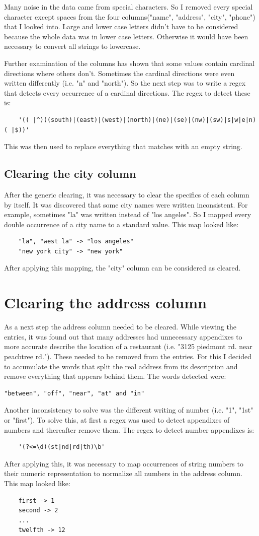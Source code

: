 \documentclass[conference]{IEEEtran}
\begin{document}
Many noise in the data came from special characters. So I removed every special character except spaces from the four columns("name", "address", "city", "phone") that I looked into. Large and lower case letters didn't have to be considered because the whole data was in lower case letters. Otherwise it would have been necessary to convert all strings to lowercase.

Further examination of the columns has shown that some values contain cardinal directions where others don't. Sometimes the cardinal directions were even written differently (i.e. "n" and "north"). So the next step was to write a regex that detects every occurrence of a cardinal directions. The regex to detect these is: 
\begin{lstlisting}
	'(( |^)((south)|(east)|(west)|(north)|(ne)|(se)|(nw)|(sw)|s|w|e|n)( |$))'
\end{lstlisting}
This was then used to replace everything that matches with an empty string.
\subsection{Clearing the city column}
After the generic clearing, it was necessary to clear the specifics of each column by itself. It was discovered that some city names were written inconsistent. For example, sometimes "la" was written instead of "los angeles". So I mapped every double occurrence of a city name to a standard value. This map looked like: 
\begin{lstlisting}
	"la", "west la" -> "los angeles"
	"new york city" -> "new york"
\end{lstlisting}
After applying this mapping, the "city" column can be considered as cleared.  
\section{Clearing the address column}
As a next step the address column needed to be cleared. While viewing the entries, it was found out that many addresses had unnecessary appendixes to more accurate describe the location of a restaurant (i.e. "3125 piedmont rd. near peachtree rd."). These needed to be removed from the entries. For this I decided to accumulate the words that split the real address from its description and remove everything that appears behind them. The words detected were: 
\begin{lstlisting}
"between", "off", "near", "at" and "in"
\end{lstlisting}
Another inconsistency to solve was the different writing of number (i.e. "1", "1st" or "first"). To solve this, at first a regex was used to detect appendixes of numbers and thereafter remove them. The regex to detect number appendixes is: 
\begin{lstlisting}
	'(?<=\d)(st|nd|rd|th)\b'
\end{lstlisting}
After applying this, it was necessary to map occurrences of string numbers to their numeric representation to normalize all numbers in the address column. This map looked like: 
\begin{lstlisting}
	first -> 1
	second -> 2
	...
	twelfth -> 12
\end{lstlisting} 
\end{document}
